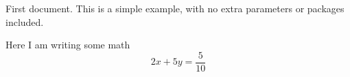 \documentclass{article}
\begin{document}
First document. This is a simple example, with no 
extra parameters or packages included.

Here I am writing some math $$2x + 5y = \frac{5}{10}$$
\end{document}
